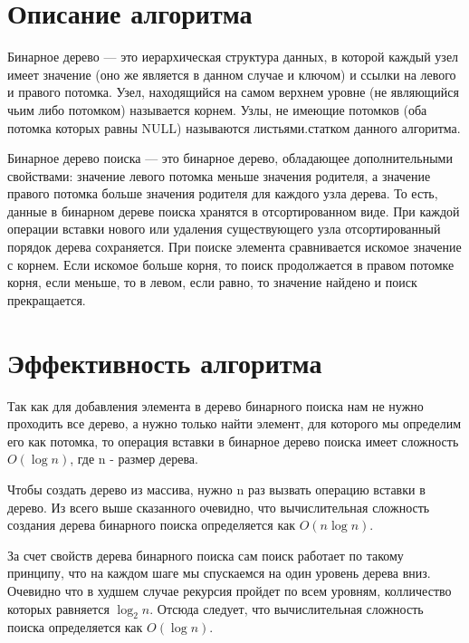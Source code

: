 \documentclass[spec, och, labwork]{shiza}
\begin{document}
\tableofcontents

\section{Описание алгоритма}

Бинарное дерево — это иерархическая структура данных, в которой каждый узел имеет значение 
(оно же является в данном случае и ключом) и ссылки на левого и правого потомка. Узел, 
находящийся на самом верхнем уровне (не являющийся чьим либо потомком) называется корнем. 
Узлы, не имеющие потомков (оба потомка которых равны NULL) называются листьями.статком данного 
алгоритма.

Бинарное дерево поиска — это бинарное дерево, обладающее дополнительными свойствами: значение 
левого потомка меньше значения родителя, а значение правого потомка больше значения родителя 
для каждого узла дерева. То есть, данные в бинарном дереве поиска хранятся в отсортированном виде. 
При каждой операции вставки нового или удаления существующего узла отсортированный порядок дерева 
сохраняется. При поиске элемента сравнивается искомое значение с корнем. Если искомое больше корня, 
то поиск продолжается в правом потомке корня, если меньше, то в левом, если равно, то значение найдено 
и поиск прекращается.

\section{Эффективность алгоритма}

Так как для добавления элемента в дерево бинарного поиска нам не нужно проходить все дерево, а нужно только
найти элемент, для которого мы определим его как потомка, то операция вставки в бинарное дерево поиска имеет 
сложность $O(\log n)$, где n - размер дерева.

Чтобы создать дерево из массива, нужно n раз вызвать операцию вставки в дерево. Из всего выше сказанного очевидно, 
что вычислительная сложность создания дерева бинарного поиска определяется как $O(n\log n)$.

За счет свойств дерева бинарного поиска сам  поиск работает по такому принципу, что на каждом шаге мы спускаемся 
на один уровень дерева вниз. Очевидно что в худшем случае рекурсия пройдет по всем уровням, колличество которых
равняется $\log_2 n$. Отсюда следует, что вычислительная сложность поиска определяется как $O(\log n)$.
\end{document}

